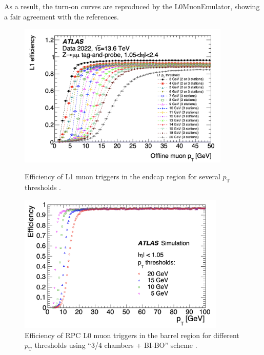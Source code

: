 As a result, the turn-on curves are reproduced by the L0MuonEmulator, showing a fair agreement with the references.

\begin{figure}[htbp]
  \centering
  \hspace{-1cm}\includegraphics[width=0.90\textwidth]{figs/chapter4/L1Muon_endcap_eff.png}
  \caption{Efficiency of L1 muon triggers in the endcap region for several $p_\mathrm{T}$ thresholds \cite{ATLASRun3Trigger}.}
  \label{fig:L1MuonEndcapEff}


  \includegraphics[width=0.88\textwidth]{figs/chapter4/L0Muon_barrel_eff.png}
  \caption{Efficiency of RPC L0 muon triggers in the barrel region for different $p_\mathrm{T}$ thresholds using ``3/4 chambers + BI-BO'' scheme \cite{TDAQ_TDR}.}
  \label{fig:L0MuonBarrelEff}
\end{figure}

